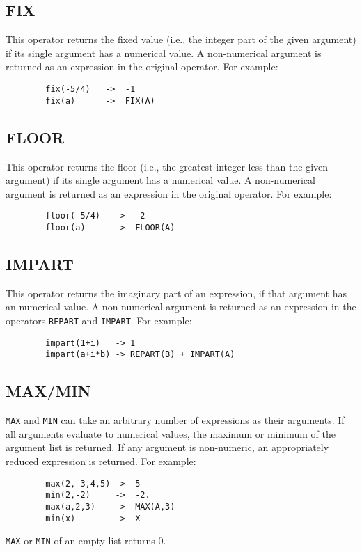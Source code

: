 \subsection{FIX}
This operator returns the fixed value (i.e., the integer part of
the given argument) if its single argument has a numerical value.  A
non-numerical argument is returned as an expression in the original
operator.  For example:

\begin{verbatim}
        fix(-5/4)   ->  -1
        fix(a)      ->  FIX(A)
\end{verbatim}

\subsection{FLOOR}
This operator returns the floor (i.e., the greatest integer less than
the given argument) if its single argument has a numerical value.  A
non-numerical argument is returned as an expression in the original
operator.  For example:

\begin{verbatim}
        floor(-5/4)   ->  -2
        floor(a)      ->  FLOOR(A)
\end{verbatim}

\subsection{IMPART}
This operator returns the imaginary part of an expression, if that argument
has an numerical value.  A non-numerical argument is returned as an expression
in the operators {\tt REPART} and {\tt IMPART}.  For example:
\begin{verbatim}
        impart(1+i)   -> 1
        impart(a+i*b) -> REPART(B) + IMPART(A)
\end{verbatim}

\subsection{MAX/MIN}

{\tt MAX} and {\tt MIN} can take an arbitrary
number of expressions as their arguments.  If all arguments evaluate to
numerical values, the maximum or minimum of the argument list is returned.
If any argument is non-numeric, an appropriately reduced expression is
returned.  For example:
\begin{verbatim}
        max(2,-3,4,5) ->  5
        min(2,-2)     ->  -2.
        max(a,2,3)    ->  MAX(A,3)
        min(x)        ->  X
\end{verbatim}
{\tt MAX} or {\tt MIN} of an empty list returns 0.

